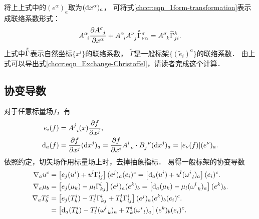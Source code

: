 将上上式中的$(e^\alpha)_{a}$取为$({\rm d}x^\alpha)_a$，
可将式\eqref{chccr:eqn_1form-transformation}表示成联络系数形式：
\begin{equation}\label{chccr:eqn_GAMMA-trans}
    A_{\hphantom{a} i}^{\alpha}\frac{\partial A_{\hphantom{a} j}^{\sigma} }{\partial x^\alpha}  
    + A_{\hphantom{a} i}^{\alpha} A_{\hphantom{a} j}^{\nu}\oversetmy{x}{\Gamma}^{\sigma}_{\nu \alpha} 
    =  A_{\hphantom{a} k}^{\sigma} \widetilde{\Gamma}^{k}_{j i}  .
\end{equation}
上式中$\oversetmy{x}{\Gamma}$表示自然坐标$\{x^i\}$的联络系数，
$\widetilde{\Gamma}$是一般标架$\{(\tilde{e}_i)^a\}$的联络系数．
由上式可以导出式\eqref{chccr:eqn_Exchange-Christoffel}，请读者完成这个计算．

\subsection{协变导数}\label{chccr:sec_CovD-Form}
对于任意标量场$f$，有
\begin{align}
    {e} _i (f)&= A_{\hphantom{a} i}^{j}(x) \frac{\partial f}{\partial x^j}, \\
    {\rm d}_a (f) &=  \frac{\partial f}{\partial x^j} ({\rm d} x^j)_a
    = \frac{\partial f}{\partial x^i}  A_{\hphantom{a} \nu}^{i}\cdot
    B^{\hphantom{a} \nu}_{j} ({\rm d} x^j)_a
    = [{e} _\nu (f)] (e^\nu)_a .
\end{align}
依照约定，切矢场作用标量场上时，去掉抽象指标．
易得一般标架的协变导数
\begin{align}
    \nabla_a u^c &= \left[e_j (u^i) + u^l \Gamma^{i}_{lj} \right] (e^j)_a (e_i)^c
    =  \left[{\rm d}_a (u^i) + u^l (\omega_{\hphantom{a} l}^{i})_a \right] (e_i)^c .   \\
    \nabla_a \mu_b &= \left[e_j (\mu_k)-\mu_l \Gamma^{l}_{kj} \right] (e^j)_a (e^k)_b
    =  \left[{\rm d}_a (\mu_k) -\mu_l (\omega_{\hphantom{a} k}^{l})_a \right] (e^k)_b . \\
    \nabla_a T_b^c & = \left[e_j (T_k^i) -T_l^i \Gamma^{l}_{kj}+ T^l_k \Gamma^{i}_{lj} \right]
          (e^j)_a (e^k)_b (e_i)^c.    \label{chccr:eqn_eTg}  \\
      &= \left[{\rm d}_a (T_k^i) -T_l^i (\omega_{\hphantom{a} k}^{l})_a
         +T^l_k (\omega_{\hphantom{a} l}^{i})_a \right] (e^k)_b (e_i)^c  .  \label{chccr:eqn_eTw}
\end{align}


